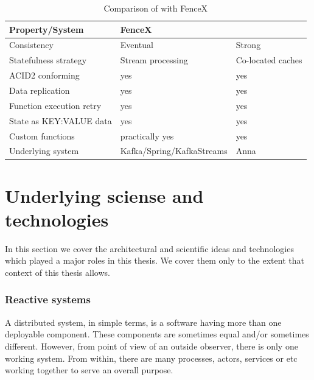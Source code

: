 \documentclass[a4]{report}
\begin{document}
    \begin{table}[h!]
        \begin{tabular}{ |l|l|l| }
            \hline
            Property/System          & FenceX                    & \cite{Functions-as-a-Service-2020} \\
            \hline
            Consistency              & Eventual                  & Strong                             \\
            Statefulness strategy    & Stream processing         & Co-located caches                  \\
            ACID2 conforming         & yes                       & yes                                \\
            Data replication         & yes                       & yes                                \\
            Function execution retry & yes                       & yes                                \\
            State as KEY:VALUE data  & yes                       & yes                                \\
            Custom functions         & practically yes           & yes                                \\
            Underlying system        & Kafka/Spring/KafkaStreams & Anna                               \\
            \hline
        \end{tabular}
        \caption{Comparison of  \cite{Functions-as-a-Service-2020} with FenceX}
        \label{table:fencex-comp}
    \end{table}


    \chapter{Underlying sciense and technologies}
    In this section we cover the architectural and scientific ideas and technologies which played a major roles in
    this thesis.
    We cover them only to the extent that context of this thesis allows.

    \subsection{Reactive systems}
    A distributed system, in simple terms, is a software having more than one deployable component.
    These components are sometimes equal and/or sometimes different.
    However, from point of view of an outside observer, there is only one working system.
    From within, there are many processes, actors, services or etc working together to serve an overall purpose.
\end{document}
